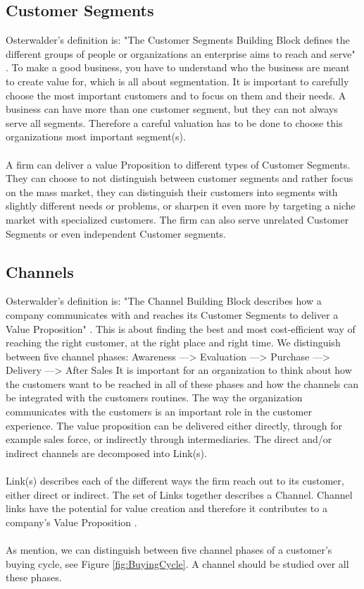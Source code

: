 \subsection{Customer Segments}
Osterwalder's definition is: "The Customer Segments Building Block defines the different groups of people or organizations an enterprise aims to reach and serve" \cite{osterwalder}. To make a good business, you have to understand who the business are meant to create value for, which is all about segmentation. It is important to carefully choose the most important customers and to focus on them and their needs. A business can have more than one customer segment, but they can not always serve all segments. Therefore a careful valuation has to be done to choose this organizations most important segment(s).  \\ \\
A firm can deliver a value Proposition to different types of Customer Segments. They can choose to not distinguish between customer segments and rather focus on the mass market, they can distinguish their customers into segments with slightly different needs or problems, or sharpen it even more by targeting a niche market with specialized customers. The firm can also serve unrelated Customer Segments or even independent Customer segments. 

\subsection{Channels}
Osterwalder's definition is: "The Channel Building Block describes how a company communicates with and reaches its Customer Segments to deliver a Value Proposition" \cite{osterwalder}. This is about finding the best and most cost-efficient way of reaching the right customer, at the right place and right time. We distinguish between five channel phases: 
Awareness ---> Evaluation ---> Purchase ---> Delivery ---> After Sales
It is important for an organization to think about how the customers want to be reached in all of these phases and how the channels can be integrated with the customers routines. The way the organization communicates with the customers is an important role in the customer experience. The value proposition can be delivered either directly, through for example sales force, or indirectly through intermediaries. The direct and/or indirect channels are decomposed into Link(s). \\ \\ 
Link(s) describes each of the different ways the firm reach out to its customer, either direct or indirect. The set of Links together describes a Channel. Channel links have the potential for value creation and therefore it contributes to a company's Value Proposition \cite{osterwalderthesis}. \\ \\
As mention, we can distinguish between five channel phases of a customer's buying cycle, see Figure \ref{fig:BuyingCycle}. A channel should be studied over all these phases.


